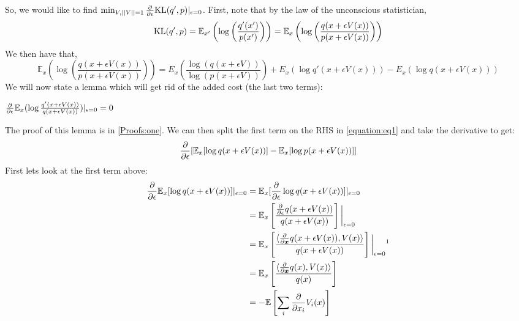 So, we would like to find $\min_{V, ||V||=1} \frac{\partial}{\partial \epsilon} \text{KL}(q',p)|_{\epsilon=0}$. First, note that by the law of the unconscious statistician,
\begin{equation}
    \text{KL}(q',p) = \mathbb{E}_{x'} \left(\log \left(\frac{q'(x')}{p(x')} \right) \right) = \mathbb{E}_{x} \left(\log \left(\frac{q(x+ \epsilon V(x))}{p(x+\epsilon V(x))} \right) \right)
\end{equation}
We then have that,
\begin{equation}\label{equation:eq1}
    \mathbb{E}_{x} \left( \log \left(\frac{q(x+ \epsilon V(x))}{p(x+\epsilon V(x))} \right) \right)
    = E_{x} \left( \frac{\log (q(x+ \epsilon V))}{\log(p(x+ \epsilon V))} \right)
    + E_{x}(\log q'(x+ \epsilon V(x)) ) - E_{x}(\log q(x+ \epsilon V(x)) )
\end{equation}
We will now state a lemma which will get rid of the added cost (the last two terms):
\begin{lemma}\label{lemma:one}
    $\frac{\partial}{\partial \epsilon} \mathbb{E}_{x}(\log \frac{q'(x + \epsilon V(x))}{q(x+ \epsilon V(x))})|_{\epsilon=0} = 0$
\end{lemma}
The proof of this lemma is in \ref{Proofs:one}. We can then split the first term on the RHS in \ref{equation:eq1} and take the derivative to get:
\begin{equation}
    \frac{\partial}{\partial \epsilon}[ \mathbb{E}_{x}[\log q(x+ \epsilon V(x))] - \mathbb{E}_{x}[\log p(x + \epsilon V(x))]]
\end{equation}
First lets look at the first term above:
\begin{align}
    \wrte \mathbb{E}_{x}[\log q(x+ \epsilon V(x))]|_{\epsilon=0} &{}
    = \mathbb{E}_{x}[\wrte \log q(x + \epsilon V(x))]|_{\epsilon=0} \\
    &= \mathbb{E}_{x} \left[\frac{\wrte q(x + \epsilon V(x))}{q(x+ \epsilon V(x))} \right] \bigg\rvert_{\epsilon=0} \\
    &= \mathbb{E}_{x} \left[\frac{\langle \wrtx q(x+\epsilon V(x)), V(x) \rangle }{q(x+ \epsilon V(x))} \right] \bigg\rvert_{\epsilon=0} 
    \text{\footnotemark}\\
    &= \mathbb{E}_{x} \left[\frac{\langle \wrtx q(x), V(x) \rangle}{q(x)} \right] \\
    &= - \mathbb{E} \left[\sum_{i} \frac{\partial}{\partial x_{i}} V_{i}(x) \right]
\end{align}
